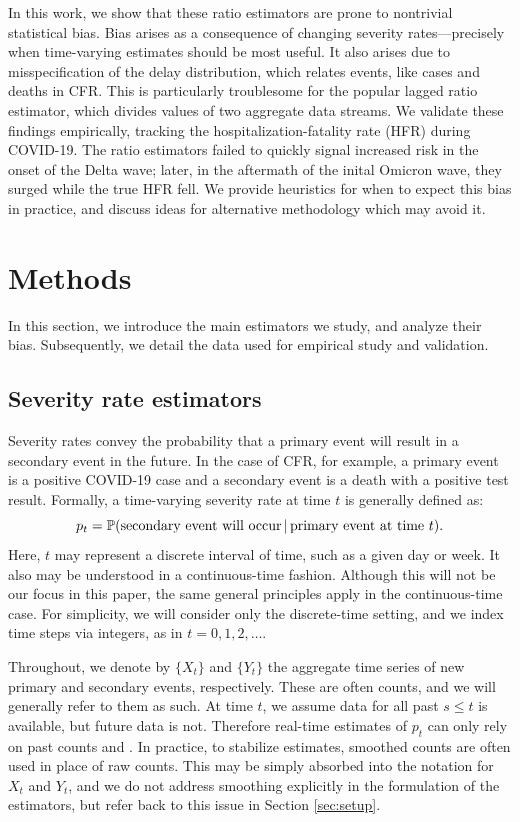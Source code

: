 \documentclass{article}
\newcommand{\given}{\, \vert \,}
\begin{document}
In this work, we show that these ratio estimators are prone to nontrivial
statistical bias. Bias arises as a consequence of changing severity
rates---precisely when time-varying estimates should be most useful. It also 
arises due to misspecification of the delay distribution, which relates events, 
like cases and deaths in CFR. This is particularly troublesome for the popular
lagged ratio estimator, which divides values of two aggregate data streams. We
validate these findings empirically, tracking the hospitalization-fatality rate
(HFR) during COVID-19. The ratio estimators failed to quickly signal increased
risk in the onset of the Delta wave; later, in the aftermath of the inital
Omicron wave, they surged while the true HFR fell. We provide heuristics for
when to expect this bias in practice, and discuss ideas for alternative
methodology which may avoid it. 

\section{Methods}
\label{sec:methods}

In this section, we introduce the main estimators we study, and analyze their 
bias. Subsequently, we detail the data used for empirical study and validation. 

\subsection{Severity rate estimators}
\label{sec:defs}

Severity rates convey the probability that a primary event will result in a
secondary event in the future. In the case of CFR, for example, a primary event
is a positive COVID-19 case and a secondary event is a death with a positive
test result. Formally, a time-varying severity rate at time $t$ is generally
defined as:  
\begin{equation}
\label{eq:severity}
p_t = \P(\text{secondary event will occur} \given \text{primary event at time 
  $t$}).   
\end{equation}
Here, $t$ may represent a discrete interval of time, such as a given day or 
week. It also may be understood in a continuous-time fashion. Although this will    
not be our focus in this paper, the same general principles apply in the
continuous-time case. For simplicity, we will consider only the discrete-time 
setting, and we index time steps via integers, as in $t=0,1,2,\dots$.    

Throughout, we denote by $\{X_t\}$ and $\{Y_t\}$ the aggregate time series of 
new primary and secondary events, respectively. These are often counts, and we
will generally refer to them as such. At time $t$, we assume data for all past
$s \leq t$ is available, but future data is not. Therefore real-time estimates of
$p_t$ can only rely on past counts  and
. In practice, to stabilize estimates, smoothed
counts are often used in place of raw counts. This may be simply absorbed into 
the notation for $X_t$ and $Y_t$, and we do not address smoothing explicitly in
the formulation of the estimators, but refer back to this issue in Section
\ref{sec:setup}.  
\end{document}
